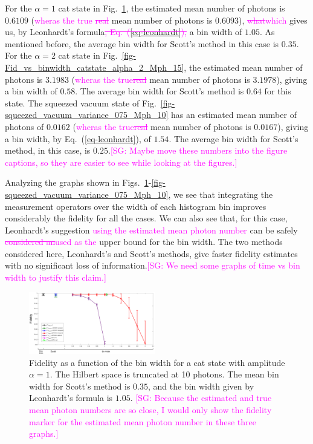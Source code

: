 \documentclass[
reprint,
superscriptaddress,
showpacs,
amsmath,
amssymb,
aps,
pra,
longbibliography
]{revtex4-1}
\providecommand{\aucmnt}[1]{#1}
\providecommand{\editcolor}[2]{\textcolor{#1}{#2}}
\providecommand{\aucmnt}[1]{}
\providecommand{\editcolor}[2]{#2}
\newcommand{\SG}[1]{\editcolor{magenta}{#1}}
\newcommand{\SGs}[1]{\aucmnt{\editcolor{magenta}{\sout{#1}}}}
\newcommand{\SGc}[1]{\aucmnt{\editcolor{magenta}{[SG: #1]}}}
\begin{document}
For the $\alpha = 1$ cat state in
Fig.~\ref{fig-Fidelity_vs_binwidth_catstate_Mph_10_alpha_1}, the
estimated mean number of photons is $0.6109$ (\SG{wheras the true}
\SGs{real} mean number of photons is $0.6093$), \SGs{what}\SG{which}
gives us, by Leonhardt's formula\SGs{, Eq.~(\ref{eq-leonhardt}),} a
bin width of $1.05$. As mentioned before, the average bin width for
Scott's method in this case is $0.35$. For the $\alpha = 2$ cat state
in Fig.~\ref{fig-Fid_vs_binwidth_catstate_alpha_2_Mph_15}, the
estimated mean number of photons is $3.1983$ (\SG{wheras the
  true}\SGs{real} mean number of photons is $3.1978$), giving a bin
width of $0.58$. The average bin width for Scott's method is $0.64$
for this state. The squeezed vacuum state of
Fig.~\ref{fig-squeezed_vacuum_variance_075_Mph_10} has an estimated
mean number of photons of $0.0162$ (\SG{wheras the true}\SGs{real}
mean number of photons is $0.0167$), giving a bin width, by
Eq.~(\ref{eq-leonhardt}), of $1.54$. The average bin width for Scott's
method, in this case, is $0.25$.\SGc{Maybe move these numbers into the
  figure captions, so they are easier to see while looking at the
  figures.}

Analyzing the graphs shown in
Figs.~\ref{fig-Fidelity_vs_binwidth_catstate_Mph_10_alpha_1}-\ref{fig-squeezed_vacuum_variance_075_Mph_10},
we see that integrating the measurement operators over the width of
each histogram bin improves considerably the fidelity for all the
cases. We can also see that, for this case, Leonhardt's suggestion
\SG{using the estimated mean photon number} can be safely
\SGs{considered an}\SG{used as the} upper bound for the bin width. The
two methods considered here, Leonhardt's and Scott's methods, give
faster fidelity estimates with no significant loss of
information.\SGc{We need some graphs of time vs bin width to justify
  this claim.}
   
\begin{figure}
  \includegraphics[width=0.49\textwidth]{fid_vs_binwidth_catstate_alpha_1_mph_10.eps}
  \caption{Fidelity as a function of the bin width for a cat state
    with amplitude $\alpha = 1$. The Hilbert space is truncated at 10
    photons. The mean bin width for Scott's method is $0.35$, and the
    bin width given by Leonhardt's formula is $1.05$. \SGc{Because the
      estimated and true mean photon numbers are so close, I would
      only show the fidelity marker for the estimated mean photon
      number in these three graphs.}}
  \label{fig-Fidelity_vs_binwidth_catstate_Mph_10_alpha_1}
\end{figure}
\end{document}
